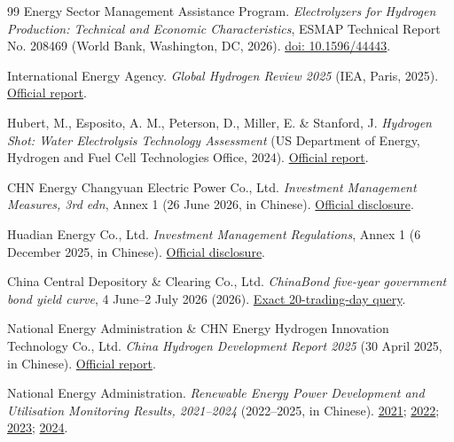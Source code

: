 \documentclass[11pt,a4paper]{article}
\begin{document}
\begin{thebibliography}{99}
Energy Sector Management Assistance Program. \emph{Electrolyzers for Hydrogen Production: Technical and Economic Characteristics}, ESMAP Technical Report No. 208469 (World Bank, Washington, DC, 2026). \href{https://doi.org/10.1596/44443}{doi: 10.1596/44443}.

International Energy Agency. \emph{Global Hydrogen Review 2025} (IEA, Paris, 2025). \href{https://www.iea.org/reports/global-hydrogen-review-2025}{Official report}.

Hubert, M., Esposito, A. M., Peterson, D., Miller, E. \& Stanford, J. \emph{Hydrogen Shot: Water Electrolysis Technology Assessment} (US Department of Energy, Hydrogen and Fuel Cell Technologies Office, 2024). \href{https://www.energy.gov/sites/default/files/2024-12/hydrogen-shot-water-electrolysis-technology-assessment.pdf}{Official report}.

CHN Energy Changyuan Electric Power Co., Ltd. \emph{Investment Management Measures, 3rd edn}, Annex 1 (26 June 2026, in Chinese). \href{https://static.cninfo.com.cn/finalpage/2026-06-26/1225388602.PDF}{Official disclosure}.

Huadian Energy Co., Ltd. \emph{Investment Management Regulations}, Annex 1 (6 December 2025, in Chinese). \href{https://static.cninfo.com.cn/finalpage/2025-12-06/1224855581.PDF}{Official disclosure}.

China Central Depository \& Clearing Co., Ltd. \emph{ChinaBond five-year government bond yield curve}, 4 June--2 July 2026 (2026). \href{https://yield.chinabond.com.cn/cbweb-pbc-web/pbc/historyQuery?startDate=2026-06-04\&endDate=2026-07-02\&gjqx=0\&qxId=ycqx}{Exact 20-trading-day query}.

National Energy Administration \& CHN Energy Hydrogen Innovation Technology Co., Ltd. \emph{China Hydrogen Development Report 2025} (30 April 2025, in Chinese). \href{https://www.nea.gov.cn/20250430/96022785b3a747248288ad1c57d3a025/c.html}{Official report}.

National Energy Administration. \emph{Renewable Energy Power Development and Utilisation Monitoring Results, 2021--2024} (2022--2025, in Chinese). \href{https://www.nea.gov.cn/2022-09/16/c_1310663387.htm}{2021}; \href{https://zfxxgk.nea.gov.cn/2023-09/07/c_1310741874.htm}{2022}; \href{https://zfxxgk.nea.gov.cn/2024-10/10/c_1310787115.htm}{2023}; \href{https://www.nea.gov.cn/20251113/cc1fb0298a2944f8bd5441f67c9be9b3/c.html}{2024}.


\end{thebibliography}
\end{document}
